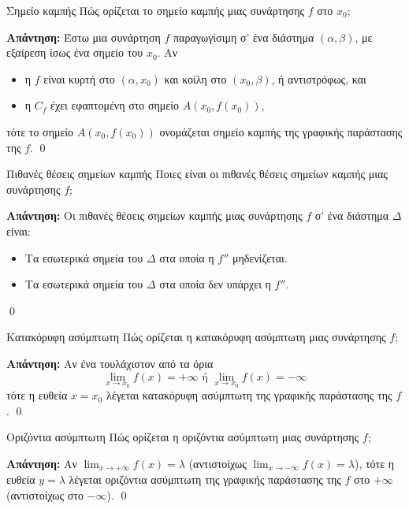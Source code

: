 \documentclass[a4paper, 12pt]{article}
\renewenvironment{proof}[1][\textbf{Απάντηση}]{%
  \par\noindent\textbf{#1:} \rmfamily}{\qed\par}
\begin{document}
\begin{theorem}{Σημείο καμπής}
  Πώς ορίζεται το σημείο καμπής μιας συνάρτησης $f$ στο $x_0$;
\end{theorem}
\begin{proof}
  Έστω μια συνάρτηση $f$ παραγωγίσιμη σ’ ένα διάστημα $(α, β)$, με εξαίρεση ίσως ένα
  σημείο του $x_0$. Αν
  \begin{itemize}
    \item η $f$ είναι κυρτή στο $(α, x_0)$ και κοίλη στο $(x_0, β)$, ή αντιστρόφως, και
    \item η $C_f$ έχει εφαπτομένη στο σημείο $A(x_0, f(x_0))$,
  \end{itemize}
  τότε το σημείο $A(x_0, f(x_0))$ ονομάζεται σημείο καμπής της γραφικής παράστασης
  της $f$.
\end{proof}

\begin{theorem}{Πιθανές θέσεις σημείων καμπής}
  Ποιες είναι οι πιθανές θέσεις σημείων καμπής μιας συνάρτησης $f$;
\end{theorem}
\begin{proof}
  Οι πιθανές θέσεις σημείων καμπής μιας συνάρτησης $f$ σ’ ένα διάστημα $Δ$ είναι:
  \begin{itemize}
    \item Τα εσωτερικά σημεία του $Δ$ στα οποία η $f ''$ μηδενίζεται.
    \item Τα εσωτερικά σημεία του $Δ$ στα οποία δεν υπάρχει η $f ''$.
  \end{itemize}
\end{proof}

\begin{theorem}{Κατακόρυφη ασύμπτωτη}
  Πώς ορίζεται η κατακόρυφη ασύμπτωτη μιας συνάρτησης $f$;
\end{theorem}
\begin{proof}
  Αν ένα τουλάχιστον από τα όρια
  $$\lim_{x \to x_0} f ( x) = +\infty \text{ ή } \lim_{x \to x_0} f ( x) = −\infty$$
  τότε η ευθεία $x = x_0$ λέγεται κατακόρυφη ασύμπτωτη της γραφικής παράστασης της $f$.
\end{proof}

\begin{theorem}{Οριζόντια ασύμπτωτη}
  Πώς ορίζεται η οριζόντια ασύμπτωτη μιας συνάρτησης $f$;
\end{theorem}
\begin{proof}
  Αν $\lim_{x \to +\infty} f ( x) = λ$ (αντιστοίχως $\lim_{x \to -\infty} f ( x) = λ$), τότε η ευθεία $y = λ$ λέγεται οριζόντια ασύμπτωτη της γραφικής παράστασης της $f$ στο $+\infty$ (αντιστοίχως στο $−\infty$).
\end{proof}
\end{document}
